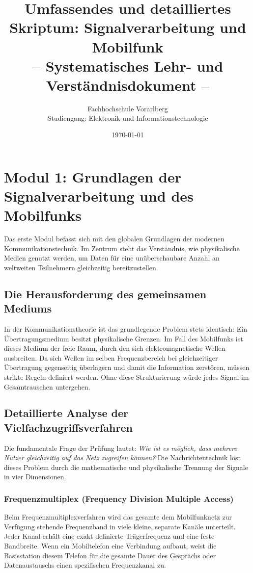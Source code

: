 \documentclass[11pt,a4paper]{article}
\begin{document}
\title{Umfassendes und detailliertes Skriptum: Signalverarbeitung und Mobilfunk\\-- Systematisches Lehr- und Verständnisdokument --}
\author{Fachhochschule Vorarlberg\\Studiengang: Elektronik und Informationstechnologie}
\date{\today}
\maketitle

\newpage
\tableofcontents
\newpage

\section{Modul 1: Grundlagen der Signalverarbeitung und des Mobilfunks}

Das erste Modul befasst sich mit den globalen Grundlagen der modernen Kommunikationstechnik. Im Zentrum steht das Verständnis, wie physikalische Medien genutzt werden, um Daten für eine unüberschaubare Anzahl an weltweiten Teilnehmern gleichzeitig bereitzustellen.

\subsection{Die Herausforderung des gemeinsamen Mediums}

In der Kommunikationstheorie ist das grundlegende Problem stets identisch: Ein Übertragungsmedium besitzt physikalische Grenzen. Im Fall des Mobilfunks ist dieses Medium der freie Raum, durch den sich elektromagnetische Wellen ausbreiten. Da sich Wellen im selben Frequenzbereich bei gleichzeitiger Übertragung gegenseitig überlagern und damit die Information zerstören, müssen strikte Regeln definiert werden. Ohne diese Strukturierung würde jedes Signal im Gesamtrauschen untergehen.

\subsection{Detaillierte Analyse der Vielfachzugriffsverfahren}

Die fundamentale Frage der Prüfung lautet: \emph{Wie ist es möglich, dass mehrere Nutzer gleichzeitig auf das Netz zugreifen können?} Die Nachrichtentechnik löst dieses Problem durch die mathematische und physikalische Trennung der Signale in vier Dimensionen.

\subsubsection{Frequenzmultiplex (Frequency Division Multiple Access)}
Beim Frequenzmultiplexverfahren wird das gesamte dem Mobilfunknetz zur Verfügung stehende Frequenzband in viele kleine, separate Kanäle unterteilt. Jeder Kanal erhält eine exakt definierte Trägerfrequenz und eine feste Bandbreite. Wenn ein Mobiltelefon eine Verbindung aufbaut, weist die Basisstation diesem Telefon für die gesamte Dauer des Gesprächs oder Datenaustauschs einen spezifischen Frequenzkanal zu. 
\end{document}

